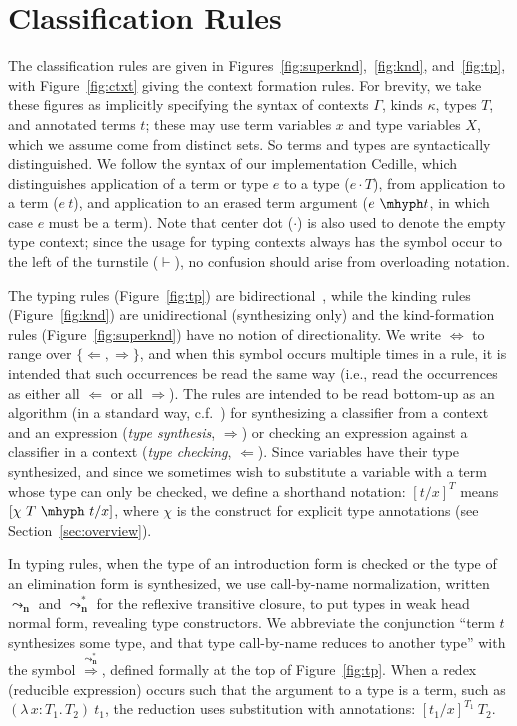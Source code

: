 \documentclass{article}
\newcommand{\abs}[4]{{#1}\, #2\! : \! #3.\, #4}
\newcommand{\leadstoc}[0]{\ensuremath{\leadsto_{\mathbf{n}}}}
\newcommand{\leadstocs}[0]{\ensuremath{\leadsto_{\mathbf{n}}^*}}
\newcommand{\tpcheck}[0]{\Leftarrow}
\newcommand{\tpsynth}[0]{\Rightarrow}
\newcommand{\tpsynthleads}[0]{\ensuremath{\overset{\leadstocs}{\Rightarrow}}}
\begin{document}
\section{Classification Rules}

The classification rules are given in
Figures~\ref{fig:superknd},~\ref{fig:knd}, and~\ref{fig:tp}, with
Figure~\ref{fig:ctxt} giving the context formation rules.
For brevity, we take these figures as implicitly specifying the syntax of
contexts \(\Gamma\), kinds $\kappa$, types $T$, and annotated terms $t$; these
may use term variables $x$ and type variables $X$, which we assume come from
distinct sets.  So terms and types are syntactically distinguished.
We follow the syntax of our implementation
Cedille, which distinguishes application of a term or type $e$ to a
type ($e \cdot T$), from application to a term ($e\ t$), and
application to an erased term argument ($e\ \mhyph t$, in which case \(e\) must
be a term).
Note that center dot (\(\cdot\)) is also used to denote the empty type context;
since the usage for typing contexts always has the symbol occur to the left of
the turnstile (\(\vdash\)), no confusion should arise from overloading notation.

The typing rules (Figure~\ref{fig:tp}) are
bidirectional~\cite{pierce+00}, while the kinding rules (Figure~\ref{fig:knd})
are unidirectional (synthesizing only) and the kind-formation rules
(Figure~\ref{fig:superknd}) have no notion of directionality.
We write $\Leftrightarrow$ to range over
$\{\tpcheck,\tpsynth\}$, and when this symbol occurs multiple times in a rule,
it is intended that such occurrences be read the same way (i.e., read the
occurrences as either all \(\tpcheck\) or all \(\tpsynth\)).
The rules are intended to be read bottom-up as an algorithm (in a standard way,
c.f.~\cite{peytonjones07,Pfe01_Lecture-Notes-on-Bidirectional-Type-Checking})
for synthesizing a classifier from a context and an expression (\emph{type
  synthesis}, \(\tpsynth\)) or checking an expression against a classifier in a
context (\emph{type checking}, \(\tpcheck\)).
Since variables have their type synthesized, and since we sometimes wish to
substitute a variable with a term whose type can only be checked, we define a
shorthand notation: \([t/x]^T\) means \([\chi\ T\ \mhyph\ t/x]\), where \(\chi\)
is the construct for explicit type annotations (see Section~\ref{sec:overview}).

In typing rules, when the type of an introduction form is checked or the type of an
elimination form is synthesized, we use call-by-name normalization, written
\(\leadstoc\) and \(\leadstocs\) for the reflexive transitive closure, to put
types in weak head normal form, revealing type constructors.
We abbreviate the conjunction ``term \(t\) synthesizes some type, and that type
call-by-name reduces to another type'' with the symbol \(\tpsynthleads\),
defined formally at the top of Figure~\ref{fig:tp}.
When a redex (reducible expression) occurs such that the argument to a type is a
term, such as \((\abs{\lambda}{x}{T_1}{T_2})\ t_1\), the reduction uses
substitution with annotations: \([t_1/x]^{T_1}\ T_2\).
\end{document}

